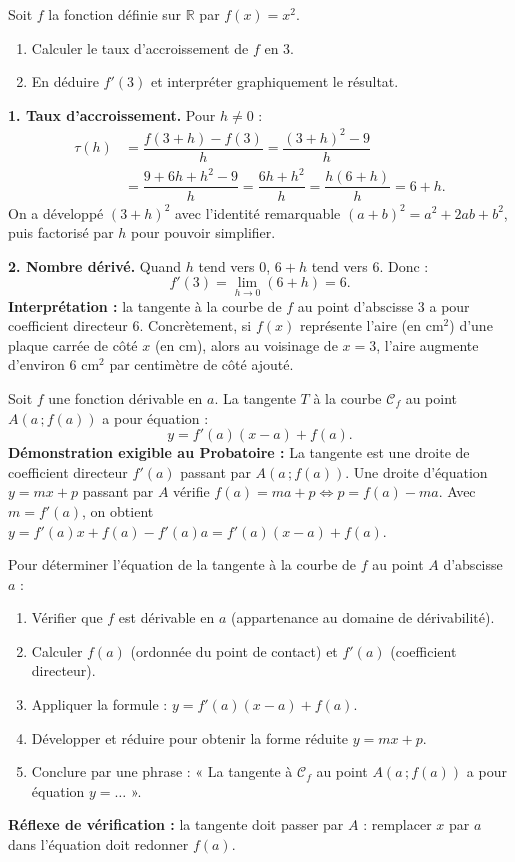 \documentclass[11pt]{article}
\newcounter{popsec}
\newcounter{popsub}
\newcommand{\courssub}[1]{%
  \stepcounter{popsub}%
  \par\vspace{9pt}\noindent{\popxbold\fontsize{11.5}{13}\selectfont\color{popink}{\color{poporange}\thepopsec.\thepopsub}\hspace{6pt}#1}\par\nopagebreak\vspace{4pt}
}
\begin{document}
\begin{exoresolu}[Nombre dérivé de la fonction carré en $a=3$]
Soit $f$ la fonction définie sur $\mathbb{R}$ par $f(x)=x^{2}$.
\begin{enumerate}
\item Calculer le taux d'accroissement de $f$ en $3$.
\item En déduire $f'(3)$ et interpréter graphiquement le résultat.
\end{enumerate}
\tcblower
\textbf{1. Taux d'accroissement.} Pour $h\neq 0$ :
\begin{align*}
\tau(h)&=\dfrac{f(3+h)-f(3)}{h}=\dfrac{(3+h)^{2}-9}{h}\\
&=\dfrac{9+6h+h^{2}-9}{h}=\dfrac{6h+h^{2}}{h}=\dfrac{h(6+h)}{h}=6+h.
\end{align*}
On a développé $(3+h)^2$ avec l'identité remarquable $(a+b)^2=a^2+2ab+b^2$, puis factorisé par $h$ pour pouvoir simplifier.

\textbf{2. Nombre dérivé.} Quand $h$ tend vers $0$, $6+h$ tend vers $6$. Donc :
\[f'(3)=\lim_{h\to 0}(6+h)=6.\]
\textbf{Interprétation :} la tangente à la courbe de $f$ au point d'abscisse $3$ a pour coefficient directeur $6$. Concrètement, si $f(x)$ représente l'aire (en cm$^2$) d'une plaque carrée de côté $x$ (en cm), alors au voisinage de $x=3$, l'aire augmente d'environ $6$ cm$^2$ par centimètre de côté ajouté.
\end{exoresolu}

\courssub{Tangente à une courbe en un point}

\begin{propriete}
Soit $f$ une fonction dérivable en $a$. La tangente $T$ à la courbe $\mathcal{C}_f$ au point $A(a\,;f(a))$ a pour équation :
\[y = f'(a)(x-a) + f(a).\]
\textbf{Démonstration exigible au Probatoire :} La tangente est une droite de coefficient directeur $f'(a)$ passant par $A(a\,;f(a))$. Une droite d'équation $y=mx+p$ passant par $A$ vérifie $f(a)=ma+p \iff p=f(a)-ma$. Avec $m=f'(a)$, on obtient $y=f'(a)x + f(a)-f'(a)a = f'(a)(x-a)+f(a)$.
\end{propriete}

\begin{methode}
Pour déterminer l'équation de la tangente à la courbe de $f$ au point $A$ d'abscisse $a$ :
\begin{enumerate}
\item Vérifier que $f$ est dérivable en $a$ (appartenance au domaine de dérivabilité).
\item Calculer $f(a)$ (ordonnée du point de contact) et $f'(a)$ (coefficient directeur).
\item Appliquer la formule : $y=f'(a)(x-a)+f(a)$.
\item Développer et réduire pour obtenir la forme réduite $y=mx+p$.
\item Conclure par une phrase : « La tangente à $\mathcal{C}_f$ au point $A(a\,;f(a))$ a pour équation $y=\ldots$ ».
\end{enumerate}
\textbf{Réflexe de vérification :} la tangente doit passer par $A$ : remplacer $x$ par $a$ dans l'équation doit redonner $f(a)$.
\end{methode}
\end{document}
